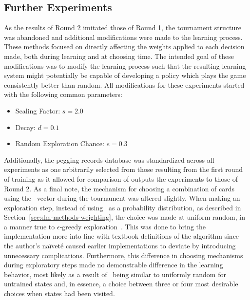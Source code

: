 

\subsection{Further Experiments}
\label{sec:findings-expts}

As the results of Round 2 imitated those of Round 1,
the tournament structure was abandoned and
additional modifications were made to the learning process.
%
These methods focused on directly affecting the weights applied to each
decision made,
both during learning and at choosing time.
%
The intended goal of these modifications was to modify the learning process
such that the resulting learning system might potentially be
capable of developing a policy which plays the game consistently better than
random.
%
All modifications for these experiments started with the following common
parameters:
\begin{itemize}
	\item Scaling Factor: $s = 2.0$
	\item Decay: $d = 0.1$
	\item Random Exploration Chance: $e = 0.3$
\end{itemize}
%
Additionally,
the pegging records database was standardized across all experiments
as one arbitrarily selected from those resulting from the first round of
training
as it allowed for comparison of outputs the experiments to those of Round 2.
%
As a final note,
the mechanism for choosing a combination of cards using the \pvec\ vector 
during the tournament was altered slightly.
%
When making an exploration step,
instead of using \pvec\ as a probability distribution,
as described in Section~\ref{sec:dm-methods-weighting},
the choice was made at uniform random,
in a manner true to $\epsilon$-greedy exploration~\cite{rl_book}.
%
This was done to bring the implementation more into line with
textbook definitions of the algorithm
since the author's naïveté caused earlier implementations to deviate
by introducing unnecessary complications.
%
Furthermore,
this difference in choosing mechanisms during exploratory steps
made no demonstrable difference in the learning behavior,
most likely as a result of \pvec\ being similar to uniformly random
for untrained states
and, in essence, a choice between three or four most desirable choices when
states had been visited.

%












